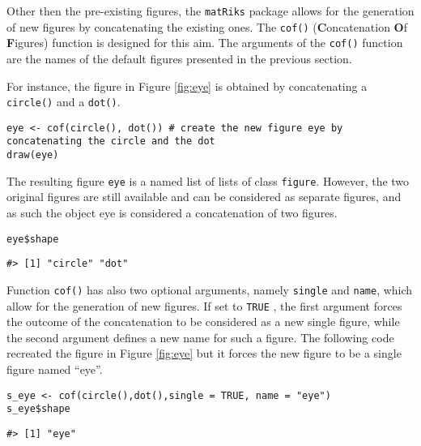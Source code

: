Other then the pre-existing figures, the \texttt{matRiks} package allows for the generation of new figures by concatenating the existing ones.
The \texttt{cof()} (\textbf{C}oncatenation \textbf{O}f \textbf{F}igures) function is designed for this aim.
The arguments of the \texttt{cof()} function are the names of the default figures presented in the previous section.

For instance, the figure in Figure \ref{fig:eye} is obtained by concatenating a \texttt{circle()} and a \texttt{dot()}.

\begin{verbatim}
eye <- cof(circle(), dot()) # create the new figure eye by concatenating the circle and the dot
draw(eye)
\end{verbatim}


The resulting figure \texttt{eye} is a named list of lists of class \texttt{figure}.
However, the two original figures are still available and can be considered as separate figures, and as such the object eye is considered a concatenation of two figures.

\begin{verbatim}
eye$shape
\end{verbatim}

\begin{verbatim}
#> [1] "circle" "dot"
\end{verbatim}

Function \texttt{cof()} has also two optional arguments, namely \texttt{single} and \texttt{name}, which allow for the generation of new figures.
If set to \texttt{TRUE} , the first argument forces the outcome of the concatenation to be considered as a new single figure, while the second argument defines a new name for such a figure.
The following code recreated the figure in Figure \ref{fig:eye} but it forces the new figure to be a single figure named ``eye''.

\begin{verbatim}
s_eye <- cof(circle(),dot(),single = TRUE, name = "eye")
s_eye$shape
\end{verbatim}

\begin{verbatim}
#> [1] "eye"
\end{verbatim}

